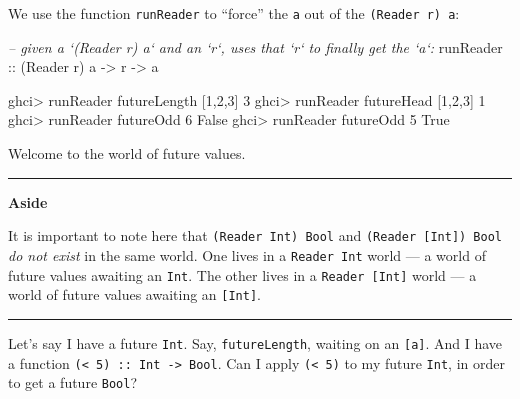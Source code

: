 \documentclass[]{article}
\newenvironment{Shaded}{}{}
\newcommand{\DataTypeTok}[1]{\textcolor[rgb]{0.56,0.13,0.00}{{#1}}}
\newcommand{\DecValTok}[1]{\textcolor[rgb]{0.25,0.63,0.44}{{#1}}}
\newcommand{\CommentTok}[1]{\textcolor[rgb]{0.38,0.63,0.69}{\textit{{#1}}}}
\newcommand{\OtherTok}[1]{\textcolor[rgb]{0.00,0.44,0.13}{{#1}}}
\newcommand{\FunctionTok}[1]{\textcolor[rgb]{0.02,0.16,0.49}{{#1}}}
\newcommand{\NormalTok}[1]{{#1}}
\begin{document}
We use the function \texttt{runReader} to ``force'' the \texttt{a} out of the
\texttt{(Reader\ r)\ a}:

\begin{Shaded}
\begin{Highlighting}[]
\CommentTok{-- given a `(Reader r) a` and an `r`, uses that `r` to finally get the `a`:}
\OtherTok{runReader ::} \NormalTok{(}\DataTypeTok{Reader} \NormalTok{r) a }\OtherTok{->} \NormalTok{r }\OtherTok{->} \NormalTok{a}
\end{Highlighting}
\end{Shaded}

\begin{Shaded}
\begin{Highlighting}[]
\NormalTok{ghci}\FunctionTok{>} \NormalTok{runReader futureLength [}\DecValTok{1}\NormalTok{,}\DecValTok{2}\NormalTok{,}\DecValTok{3}\NormalTok{]}
\DecValTok{3}
\NormalTok{ghci}\FunctionTok{>} \NormalTok{runReader futureHead [}\DecValTok{1}\NormalTok{,}\DecValTok{2}\NormalTok{,}\DecValTok{3}\NormalTok{]}
\DecValTok{1}
\NormalTok{ghci}\FunctionTok{>} \NormalTok{runReader futureOdd }\DecValTok{6}
\DataTypeTok{False}
\NormalTok{ghci}\FunctionTok{>} \NormalTok{runReader futureOdd }\DecValTok{5}
\DataTypeTok{True}
\end{Highlighting}
\end{Shaded}

Welcome to the world of future values.

\begin{center}\rule{0.5\linewidth}{\linethickness}\end{center}

\textbf{Aside}

It is important to note here that \texttt{(Reader\ Int)\ Bool} and
\texttt{(Reader\ {[}Int{]})\ Bool} \emph{do not exist} in the same world. One lives in a
\texttt{Reader\ Int} world --- a world of future values awaiting an \texttt{Int}. The other lives in
a \texttt{Reader\ {[}Int{]}} world --- a world of future values awaiting an \texttt{{[}Int{]}}.

\begin{center}\rule{0.5\linewidth}{\linethickness}\end{center}

Let's say I have a future \texttt{Int}. Say, \texttt{futureLength}, waiting on an \texttt{{[}a{]}}.
And I have a function \texttt{(\textless{}\ 5)\ ::\ Int\ -\textgreater{}\ Bool}. Can I apply
\texttt{(\textless{}\ 5)} to my future \texttt{Int}, in order to get a future \texttt{Bool}?
\end{document}
